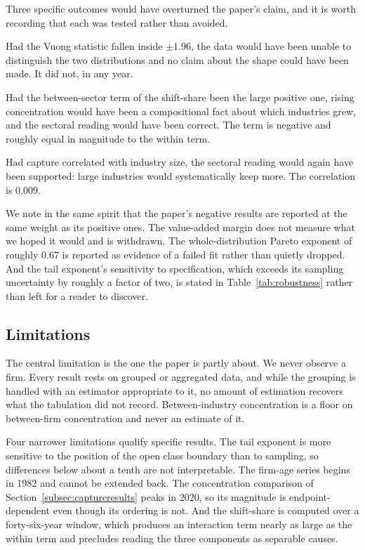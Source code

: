 \documentclass[jrfm,article,submit,pdftex,moreauthors]{Definitions/mdpi}
\begin{document}
Three specific outcomes would have overturned the paper's claim, and it is worth recording
that each was tested rather than avoided.

Had the Vuong statistic fallen inside $\pm 1.96$, the data would have been unable to
distinguish the two distributions and no claim about the shape could have been made. It did
not, in any year.

Had the between-sector term of the shift-share been the large positive one, rising
concentration would have been a compositional fact about which industries grew, and the
sectoral reading would have been correct. The term is negative and roughly equal in magnitude
to the within term.

Had capture correlated with industry size, the sectoral reading would again have been
supported: large industries would systematically keep more. The correlation is 0.009.

We note in the same spirit that the paper's negative results are reported at the same weight
as its positive ones. The value-added margin does not measure what we hoped it would and is
withdrawn. The whole-distribution Pareto exponent of roughly 0.67 is reported as evidence of
a failed fit rather than quietly dropped. And the tail exponent's sensitivity to
specification, which exceeds its sampling uncertainty by roughly a factor of two, is stated
in Table~\ref{tab:robustness} rather than left for a reader to discover.

\subsection{Limitations}
\label{subsec:limits}

The central limitation is the one the paper is partly about. We never observe a firm. Every
result rests on grouped or aggregated data, and while the grouping is handled with an
estimator appropriate to it, no amount of estimation recovers what the tabulation did not
record. Between-industry concentration is a floor on between-firm concentration and never an
estimate of it.

Four narrower limitations qualify specific results. The tail exponent is more sensitive to
the position of the open class boundary than to sampling, so differences below about a tenth
are not interpretable. The firm-age series begins in 1982 and cannot be extended back. The
concentration comparison of Section~\ref{subsec:captureresults} peaks in 2020, so its
magnitude is endpoint-dependent even though its ordering is not. And the shift-share is
computed over a forty-six-year window, which produces an interaction term nearly as large as
the within term and precludes reading the three components as separable causes.
\end{document}
